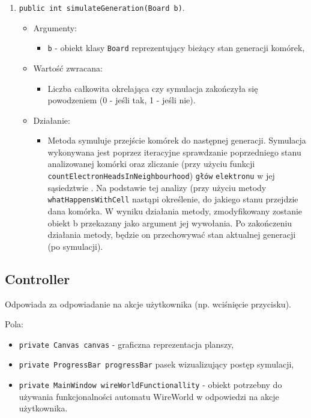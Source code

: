\documentclass[a4paper,11pt, notitlepage ]{article}
\begin{document}
\begin{enumerate}
\item \verb+public int simulateGeneration(Board b)+.
\begin{itemize}
\item Argumenty:
\begin{itemize}
\item \verb+b+  - obiekt klasy \verb+Board+ reprezentujący bieżący stan generacji komórek,
\end{itemize}
\item Wartość zwracana:
\begin{itemize}
\item Liczba całkowita okrelająca czy symulacja zakończyła się powodzeniem (0 - jeśli tak, 1 - jeśli nie).
\end{itemize}
\item Działanie:
\begin{itemize}
\item Metoda symuluje przejście komórek do następnej generacji. Symulacja wykonywana jest poprzez iteracyjne sprawdzanie poprzedniego stanu analizowanej komórki oraz zliczanie (przy użyciu funkcji \verb+countElectronHeadsInNeighbourhood+) \verb+głów+ \verb+elektronu+ w jej sąsiedztwie . Na podstawie tej analizy (przy użyciu metody \verb+whatHappensWithCell+ nastąpi określenie, do jakiego stanu przejdzie dana komórka. W wyniku działania metody, zmodyfikowany zostanie obiekt b przekazany jako argument jej wywołania. Po zakończeniu działania metody, będzie on przechowywać stan aktualnej generacji (po symulacji).
\end{itemize}
\end{itemize}



\end{enumerate}

\subsection{Controller}
Odpowiada za odpowiadanie na akcje użytkownika (np. wciśnięcie przycisku). 

Pola:
\begin{itemize}
\item \verb+private Canvas canvas+ - graficzna reprezentacja planszy,
\item \verb+private ProgressBar progressBar+ pasek wizualizujący postęp symulacji,
\item \verb+private MainWindow wireWorldFunctionallity+ - obiekt potrzebny do używania funkcjonalności automatu WireWorld w odpowiedzi na akcje użytkownika.
\end{itemize}
\end{document}
